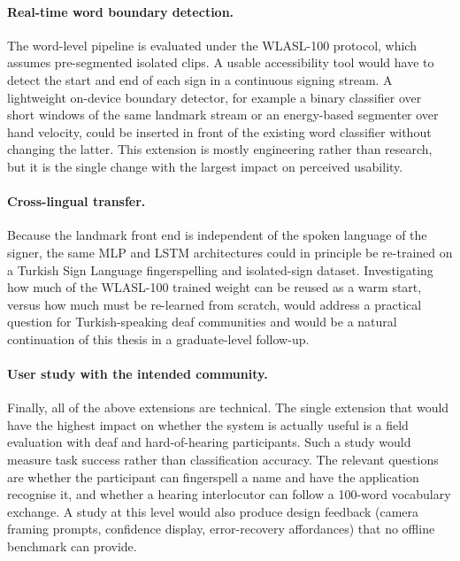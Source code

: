 \paragraph{Real-time word boundary detection.}
The word-level pipeline is evaluated under the WLASL-100 protocol,
which assumes pre-segmented isolated clips. A usable accessibility
tool would have to detect the start and end of each sign in a
continuous signing stream. A lightweight on-device boundary
detector, for example a binary classifier over short windows of the
same landmark stream or an energy-based segmenter over hand
velocity, could be inserted in front of the existing word
classifier without changing the latter. This extension is mostly
engineering rather than research, but it is the single change with
the largest impact on perceived usability.

\paragraph{Cross-lingual transfer.}
Because the landmark front end is independent of the spoken
language of the signer, the same MLP and LSTM architectures could
in principle be re-trained on a Turkish Sign Language
fingerspelling and isolated-sign dataset. Investigating how much
of the WLASL-100 trained weight can be reused as a warm start,
versus how much must be re-learned from scratch, would address a
practical question for Turkish-speaking deaf communities and would
be a natural continuation of this thesis in a graduate-level
follow-up.

\paragraph{User study with the intended community.}
Finally, all of the above extensions are technical. The single
extension that would have the highest impact on whether the system
is actually useful is a field evaluation with deaf and
hard-of-hearing participants. Such a study would measure task success rather than
classification accuracy. The relevant questions are whether the
participant can fingerspell a name and have the application recognise
it, and whether a hearing interlocutor can follow a 100-word
vocabulary exchange. A study at this level would also produce design
feedback (camera framing prompts, confidence display, error-recovery
affordances) that no offline benchmark can provide.
